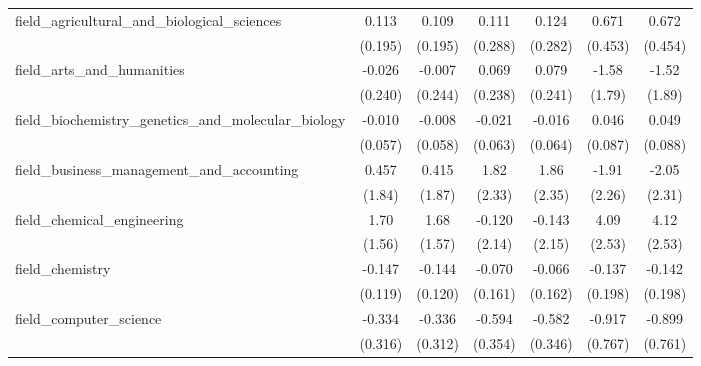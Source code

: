 \begin{tabular}{lcccccc}
   field\_agricultural\_and\_biological\_sciences              & 0.113         & 0.109        & 0.111         & 0.124         & 0.671         & 0.672\\   
                                                               & (0.195)       & (0.195)      & (0.288)       & (0.282)       & (0.453)       & (0.454)\\   
   field\_arts\_and\_humanities                                & -0.026        & -0.007       & 0.069         & 0.079         & -1.58         & -1.52\\   
                                                               & (0.240)       & (0.244)      & (0.238)       & (0.241)       & (1.79)        & (1.89)\\   
   field\_biochemistry\_genetics\_and\_molecular\_biology      & -0.010        & -0.008       & -0.021        & -0.016        & 0.046         & 0.049\\   
                                                               & (0.057)       & (0.058)      & (0.063)       & (0.064)       & (0.087)       & (0.088)\\   
   field\_business\_management\_and\_accounting                & 0.457         & 0.415        & 1.82          & 1.86          & -1.91         & -2.05\\   
                                                               & (1.84)        & (1.87)       & (2.33)        & (2.35)        & (2.26)        & (2.31)\\   
   field\_chemical\_engineering                                & 1.70          & 1.68         & -0.120        & -0.143        & 4.09          & 4.12\\   
                                                               & (1.56)        & (1.57)       & (2.14)        & (2.15)        & (2.53)        & (2.53)\\   
   field\_chemistry                                            & -0.147        & -0.144       & -0.070        & -0.066        & -0.137        & -0.142\\   
                                                               & (0.119)       & (0.120)      & (0.161)       & (0.162)       & (0.198)       & (0.198)\\   
   field\_computer\_science                                    & -0.334        & -0.336       & -0.594        & -0.582        & -0.917        & -0.899\\   
                                                               & (0.316)       & (0.312)      & (0.354)       & (0.346)       & (0.767)       & (0.761)\\   

\end{tabular}
